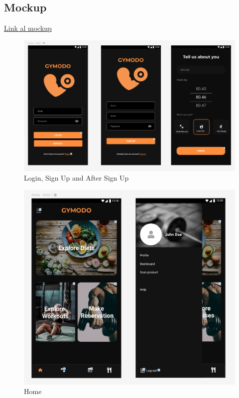 \documentclass[12pt,a4paper]{article}
\begin{document}
\clearpage

\subsection{Mockup}
\href{https://mockittapp.wondershare.com/app/3398ef738f7ac4f35fae5df4eb77004473612d19?simulator_type=device&sticky}{Link al mockup}

\begin{figure}[h]
  \centering
 \includegraphics[width=1\textwidth]{login-reg-after}
 \caption{Login, Sign Up and After Sign Up}
\end{figure}



\begin{figure}[h]
  \centering
 \includegraphics[width=1\textwidth]{home}
 \caption{Home}
\end{figure}
\end{document}
